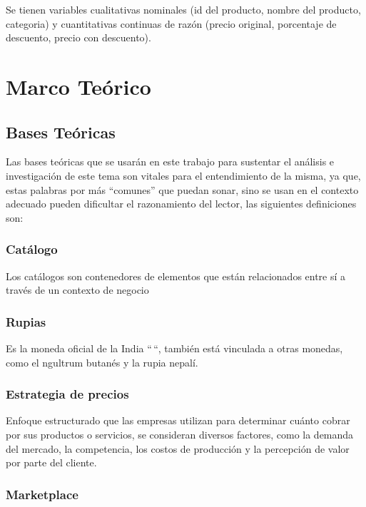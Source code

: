 \documentclass[oneside,11pt]{Latex/Classes/PhDthesisPSnPDF}
\begin{document}
Se tienen variables cualitativas nominales (id del producto, nombre del
producto, categoria) y cuantitativas continuas de razón (precio
original, porcentaje de descuento, precio con descuento).

\chapter{Marco Teórico}

\section{Bases Teóricas}

Las bases teóricas que se usarán en este trabajo para sustentar el
análisis e investigación de este tema son vitales para el entendimiento
de la misma, ya que, estas palabras por más ``comunes'' que puedan
sonar, sino se usan en el contexto adecuado pueden dificultar el
razonamiento del lector, las siguientes definiciones son:\\

\subsection{Catálogo}

Los catálogos son contenedores de elementos que están relacionados entre
sí a través de un contexto de negocio\\

\subsection{Rupias}

Es la moneda oficial de la India ``\,``, también está vinculada a otras
monedas, como el ngultrum butanés y la rupia nepalí.\\

\subsection{Estrategia de precios }

Enfoque estructurado que las empresas utilizan para determinar cuánto
cobrar por sus productos o servicios, se consideran diversos factores,
como la demanda del mercado, la competencia, los costos de producción y
la percepción de valor por parte del cliente.\\

\subsection{Marketplace }
\end{document}
